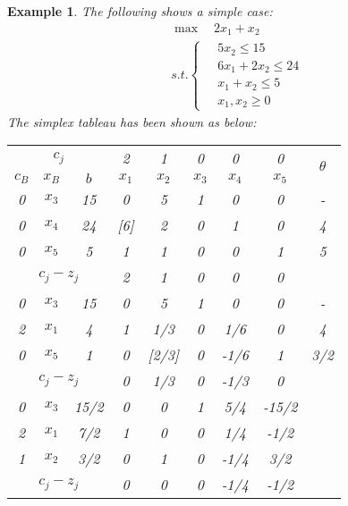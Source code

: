\documentclass{article}
\newtheorem{example}{Example}
\begin{document}
\begin{example}
	The following shows a simple case:
	\begin{align}
		&\max \quad  2x_1 + x_2 \\
		& s.t. \left\{ \begin{aligned}
		 \ & 5x_2 \leq 15 \\
		& 6x_1 + 2x_2 \leq 24 \\
		& x_1 + x_2 \leq 5 \\
		& x_1, x_2 \geq 0
		\end{aligned} \right.
	\end{align}
	The simplex tableau has been shown as below:
	\begin{table}[htbp]
		\centering
		\label{tab:simpelx}
		\begin{tabular}{@{}ccccccccc@{}}
			\toprule
			\multicolumn{3}{c}{$c_j$}      & 2       & 1    & 0    & 0    & 0     & \multirow{2}{*}{$\theta$} \\ \cmidrule(r){1-8}
			$c_B$     & $x_B$     & $b$       & $x_1$    & $x_2$ & $x_3$ & $x_4$ & $x_5$  &                        \\ \midrule
			0        & $x_3$     & 15      & 0       & 5    & 1    & 0    & 0     & -                      \\
			0        & $x_4$     & 24      & [6] & 2    & 0    & 1    & 0     & 4                      \\
			0        & $x_5$     & 5       & 1       & 1    & 0    & 0    & 1     & 5                      \\ \midrule
			\multicolumn{3}{c}{$c_j-z_j$} & 2       & 1    & 0    & 0    & 0     &                        \\ \midrule
			0        & $x_3$     & 15      & 0       & 5    & 1    & 0    & 0     & -                      \\
			2        & $x_1$     & 4       & 1       & 1/3  & 0    & 1/6  & 0     & 4                      \\
			0        & $x_5$     & 1       & 0       & [2/3]  & 0    & -1/6 & 1     & 3/2                    \\ \midrule
			\multicolumn{3}{c}{$c_j-z_j$} & 0       & 1/3  & 0    & -1/3 & 0     &                        \\ \midrule
			0        & $x_3$     & 15/2    & 0       & 0    & 1    & 5/4  & -15/2 &                        \\
			2        & $x_1$     & 7/2     & 1       & 0    & 0    & 1/4  & -1/2  &                        \\
			1        & $x_2$     & 3/2     & 0       & 1    & 0    & -1/4 & 3/2   &                        \\ \midrule
			\multicolumn{3}{c}{$c_j-z_j$} & 0       & 0    & 0    & -1/4 & -1/2  &                        \\ \bottomrule
		\end{tabular}%
	\end{table}
\end{example}
\end{document}
